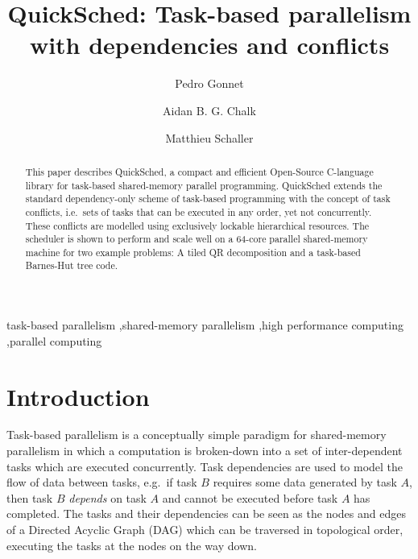 \documentclass[preprint]{elsarticle}
\begin{document}
\title{QuickSched: Task-based parallelism with dependencies and conflicts}
\author[ecs,ggl]{Pedro Gonnet} 
\author[ecs]{Aidan B. G. Chalk} 
\author[icc]{Matthieu Schaller} 
\address[ecs]{School of Engineering and Computing Sciences, Durham University, South Road, Durham DH1 3LE, United Kingdom.}
\address[icc]{Institute for Computational Cosmology, Durham University, South Road, Durham DH1 3LE, United Kingdom.}
\address[ggl]{Google Switzerland GmbH, Brandshenkestr. 110, 8002 Z\"urich, Switzerland.}

\begin{abstract}
This paper describes QuickSched, a compact and efficient Open-Source
C-language library for task-based shared-memory parallel programming.
QuickSched extends the standard dependency-only scheme of task-based
programming with the concept of task conflicts, i.e.~sets of tasks
that can be executed in any order, yet not concurrently.
These conflicts are modelled using exclusively lockable
hierarchical resources.
The scheduler is shown to perform and scale well on a 64-core parallel
shared-memory machine for two example problems: A tiled QR
decomposition and a task-based Barnes-Hut tree code.
\end{abstract}

\begin{keyword}
    task-based parallelism \sep shared-memory parallelism \sep high performance computing \sep parallel computing
\end{keyword}

\maketitle


\section{Introduction}

Task-based parallelism is a conceptually simple paradigm for
shared-memory parallelism in which a computation is broken-down
into a set of inter-dependent tasks which are executed
concurrently.
Task dependencies are used to model the flow of data between
tasks, e.g.~if task $B$ requires some data generated by task $A$,
then task $B$ {\em depends} on task $A$ and cannot be executed
before task $A$ has completed.
The tasks and their dependencies can be seen as the nodes and edges
of a Directed Acyclic Graph (DAG) which can be
traversed in topological order, executing the tasks at the nodes
on the way down.
\end{document}
